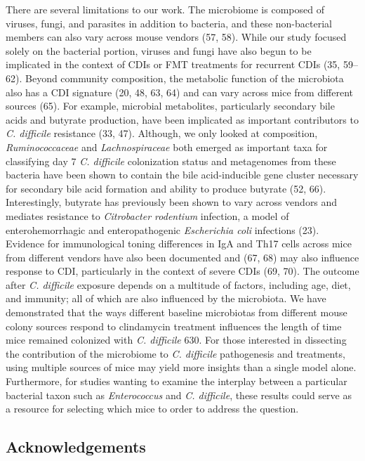 \documentclass[11pt,]{article}
\begin{document}
There are several limitations to our work. The microbiome is composed of
viruses, fungi, and parasites in addition to bacteria, and these
non-bacterial members can also vary across mouse vendors (57, 58). While
our study focused solely on the bacterial portion, viruses and fungi
have also begun to be implicated in the context of CDIs or FMT
treatments for recurrent CDIs (35, 59--62). Beyond community
composition, the metabolic function of the microbiota also has a CDI
signature (20, 48, 63, 64) and can vary across mice from different
sources (65). For example, microbial metabolites, particularly secondary
bile acids and butyrate production, have been implicated as important
contributors to \emph{C. difficile} resistance (33, 47). Although, we
only looked at composition, \emph{Ruminococcaceae} and
\emph{Lachnospiraceae} both emerged as important taxa for classifying
day 7 \emph{C. difficile} colonization status and metagenomes from these
bacteria have been shown to contain the bile acid-inducible gene cluster
necessary for secondary bile acid formation and ability to produce
butyrate (52, 66). Interestingly, butyrate has previously been shown to
vary across vendors and mediates resistance to \emph{Citrobacter
rodentium} infection, a model of enterohemorrhagic and enteropathogenic
\emph{Escherichia coli} infections (23). Evidence for immunological
toning differences in IgA and Th17 cells across mice from different
vendors have also been documented and (67, 68) may also influence
response to CDI, particularly in the context of severe CDIs (69, 70).
The outcome after \emph{C. difficile} exposure depends on a multitude of
factors, including age, diet, and immunity; all of which are also
influenced by the microbiota. We have demonstrated that the ways
different baseline microbiotas from different mouse colony sources
respond to clindamycin treatment influences the length of time mice
remained colonized with \emph{C. difficile} 630. For those interested in
dissecting the contribution of the microbiome to \emph{C. difficile}
pathogenesis and treatments, using multiple sources of mice may yield
more insights than a single model alone. Furthermore, for studies
wanting to examine the interplay between a particular bacterial taxon
such as \emph{Enterococcus} and \emph{C. difficile}, these results could
serve as a resource for selecting which mice to order to address the
question.

\newpage

\subsection{Acknowledgements}\label{acknowledgements}
\end{document}
